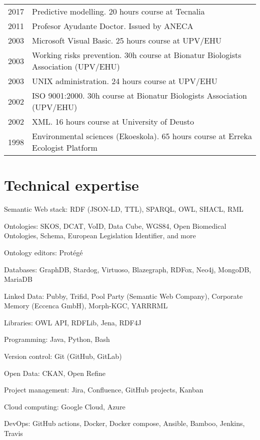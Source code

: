 \documentclass[11pt,fullpage]{article}
\renewenvironment{itemize}{
  \begin{list}{}{
    \setlength{\leftmargin}{1.5em}
  }
}{
  \end{list}
}
\begin{document}
\begin{longtable}{p{0.5in}|p{5.5in}}
  2017 & Predictive modelling. 20 hours course at Tecnalia \\
  2011 & Profesor Ayudante Doctor. Issued by ANECA \\
  2003 & Microsoft Visual Basic. 25 hours course at UPV/EHU \\
  2003 & Working risks prevention. 30h course at Bionatur Biologists Association (UPV/EHU) \\
  2003 & UNIX administration. 24 hours course at UPV/EHU \\
  2002 & ISO 9001:2000. 30h course at Bionatur Biologists Association (UPV/EHU) \\
  2002 & XML. 16 hours course at University of Deusto \\
  1998 & Environmental sciences (Ekoeskola). 65 hours course at Erreka Ecologist Platform \\
  
\end{longtable}

\section*{Technical expertise}

\begin{itemize}
  \item Semantic Web stack: RDF (JSON-LD, TTL), SPARQL, OWL, SHACL, RML
  \item Ontologies: SKOS, DCAT, VoID, Data Cube, WGS84, Open Biomedical Ontologies, Schema, European Legislation Identifier, and more
  \item Ontology editors: Prot\'eg\'e 
  \item Databases: GraphDB, Stardog, Virtuoso, Blazegraph, RDFox, Neo4j, 
  MongoDB,
  MariaDB
  \item Linked Data: Pubby, Trifid, Pool Party (Semantic Web Company), Corporate Memory (Eccenca GmbH), Morph-KGC, YARRRML
  \item Libraries: OWL API, RDFLib, Jena, RDF4J
  \item Programming: Java, Python, Bash
  \item Version control: Git (GitHub, GitLab)
  \item Open Data: CKAN, Open Refine
  \item Project management: Jira, Confluence, GitHub projects, Kanban
  \item Cloud computing: Google Cloud, Azure %
  \item DevOps: GitHub actions, Docker, Docker compose, Ansible, Bamboo, Jenkins, Travis
\end{itemize}
\end{document}
